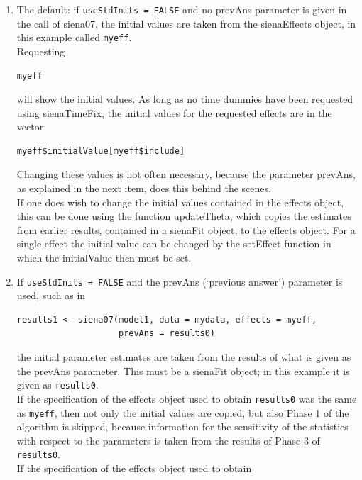 \documentclass[a4paper,fleqn,11pt]{article}
\newcommand{\+}{\, + \,}
\newcommand{\sfn}[1]{\textsf{#1}}
\begin{document}
\begin{enumerate}
\item The default: if \texttt{useStdInits = FALSE} and no \textsf{prevAns}
      parameter is given in the call of \textsf{siena07},
      the initial values are taken from the \textsf{sienaEffects} object,
      in this example called \texttt{myeff}.\\
      Requesting
\begin{verbatim}
myeff
\end{verbatim}
      will show the initial values.
      As long as no time dummies have been requested
      using \textsf{sienaTimeFix}, the initial values for the requested
      effects are in the vector
\begin{verbatim}
myeff$initialValue[myeff$include]
\end{verbatim}
      Changing these values is not often necessary, because the
      parameter \textsf{prevAns}, as explained in the next item,
      does this behind the scenes.\\
       If one does wish to change the initial values contained in
      the effects object, this can be done using the
      function \textsf{updateTheta}, which copies the
      estimates from earlier results, contained in a
      \sfn{sienaFit} object, to the effects object.
      For a single effect the initial value can be changed
      by the \textsf{setEffect}
      function in which the \textsf{initialValue} then must be set.
\item If \texttt{useStdInits = FALSE} and the \textsf{prevAns}
      (`previous answer')
      parameter is used, such as in
      \begin{verbatim}
results1 <- siena07(model1, data = mydata, effects = myeff,
                    prevAns = results0)
      \end{verbatim}
      the initial parameter estimates are taken from the results of
      what is given as the
      \textsf{prevAns} parameter. This must be a
      \textsf{sienaFit} object; in this example it is given as
      \texttt{results0}.\\
      If the specification of the effects object used to obtain
      \texttt{results0} was the same as \texttt{myeff}, then not only the initial
      values are copied, but also Phase 1 of the algorithm is skipped,
      because information for the sensitivity of the statistics with
      respect to the parameters is taken from the results of Phase 3
      of \texttt{results0}.\\
      If the specification of the effects object used to obtain

\end{enumerate}
\end{document}
